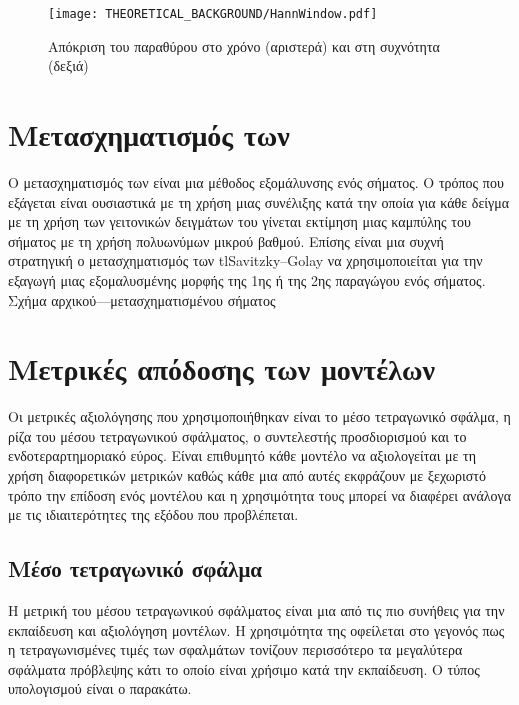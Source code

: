 \begin{figure}[H]
  \begin{center}
    \texttt{[image: THEORETICAL\_BACKGROUND/HannWindow.pdf]}
    \caption{Απόκριση του παραθύρου  στο χρόνο (αριστερά) και στη συχνότητα (δεξιά)}
  \end{center}
\end{figure}

\section{Μετασχηματισμός των }
Ο μετασχηματισμός των \cite{savitzky_golay} είναι μια μέθοδος εξομάλυνσης ενός σήματος. Ο τρόπος που εξάγεται είναι ουσιαστικά με τη χρήση μιας συνέλιξης κατά την οποία για κάθε δείγμα με τη χρήση των γειτονικών δειγμάτων του γίνεται εκτίμηση μιας καμπύλης του σήματος με τη χρήση πολυωνύμων μικρού βαθμού. Επίσης είναι μια συχνή στρατηγική ο μετασχηματισμός των tl{Savitzky--Golay} να χρησιμοποιείται για την εξαγωγή μιας εξομαλυσμένης μορφής της 1ης ή της 2ης παραγώγου ενός σήματος.\\

Σχήμα αρχικού---μετασχηματισμένου σήματος

\section{Μετρικές απόδοσης των μοντέλων}
Οι μετρικές αξιολόγησης που χρησιμοποιήθηκαν είναι το μέσο τετραγωνικό σφάλμα, η ρίζα του μέσου τετραγωνικού σφάλματος, ο συντελεστής προσδιορισμού και το ενδοτεραρτημοριακό εύρος. Είναι επιθυμητό κάθε μοντέλο να αξιολογείται με τη χρήση διαφορετικών μετρικών καθώς κάθε μια από αυτές εκφράζουν με ξεχωριστό τρόπο την επίδοση ενός μοντέλου και η χρησιμότητα τους μπορεί να διαφέρει ανάλογα με τις ιδιαιτερότητες της εξόδου που προβλέπεται.

\subsection{Μέσο τετραγωνικό σφάλμα}
Η μετρική του μέσου τετραγωνικού σφάλματος είναι μια από τις πιο συνήθεις για την εκπαίδευση και αξιολόγηση μοντέλων. Η χρησιμότητα της οφείλεται στο γεγονός πως η τετραγωνισμένες τιμές των σφαλμάτων τονίζουν περισσότερο τα μεγαλύτερα σφάλματα πρόβλεψης κάτι το οποίο είναι χρήσιμο κατά την εκπαίδευση. Ο τύπος υπολογισμού είναι ο παρακάτω.

